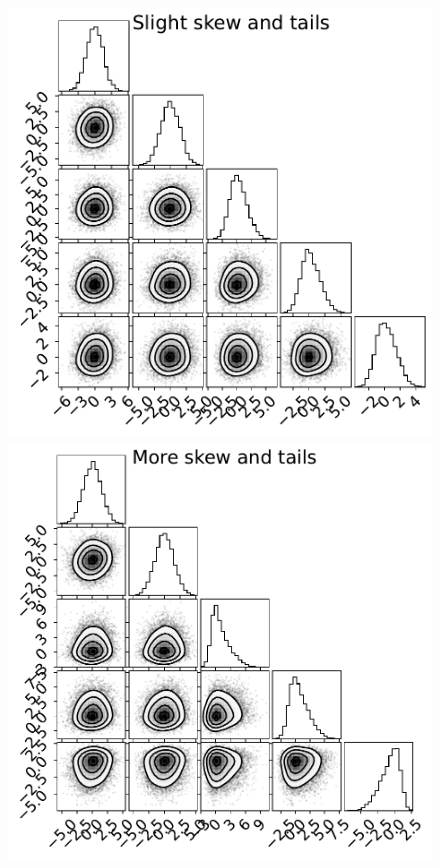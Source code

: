\begin{figure}[t]
    \centering
    \includegraphics[scale=0.28]{figs/expts-2d/sinh_5D_target1v2.pdf}
    \includegraphics[scale=0.28]{figs/expts-2d/sinh_5D_target2v2.pdf}

\end{figure}
